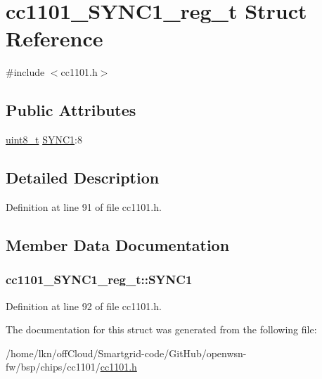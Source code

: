 \hypertarget{structcc1101___s_y_n_c1__reg__t}{}\section{cc1101\+\_\+\+S\+Y\+N\+C1\+\_\+reg\+\_\+t Struct Reference}
\label{structcc1101___s_y_n_c1__reg__t}


{\ttfamily \#include $<$cc1101.\+h$>$}

\subsection*{Public Attributes}
\begin{DoxyCompactItemize}
\item 
\hyperlink{_p_e___types_8h_aba7bc1797add20fe3efdf37ced1182c5}{uint8\+\_\+t} \hyperlink{structcc1101___s_y_n_c1__reg__t_a4083bf95751dd9f7d80ba7eb3c5a7244}{S\+Y\+N\+C1}\+:8
\end{DoxyCompactItemize}


\subsection{Detailed Description}


Definition at line 91 of file cc1101.\+h.



\subsection{Member Data Documentation}
\subsubsection[{\texorpdfstring{S\+Y\+N\+C1}{SYNC1}}]{ cc1101\+\_\+\+S\+Y\+N\+C1\+\_\+reg\+\_\+t\+::\+S\+Y\+N\+C1}\hypertarget{structcc1101___s_y_n_c1__reg__t_a4083bf95751dd9f7d80ba7eb3c5a7244}{}\label{structcc1101___s_y_n_c1__reg__t_a4083bf95751dd9f7d80ba7eb3c5a7244}


Definition at line 92 of file cc1101.\+h.



The documentation for this struct was generated from the following file\+:\begin{DoxyCompactItemize}
\item 
/home/lkn/off\+Cloud/\+Smartgrid-\/code/\+Git\+Hub/openwsn-\/fw/bsp/chips/cc1101/\hyperlink{cc1101_8h}{cc1101.\+h}\end{DoxyCompactItemize}
